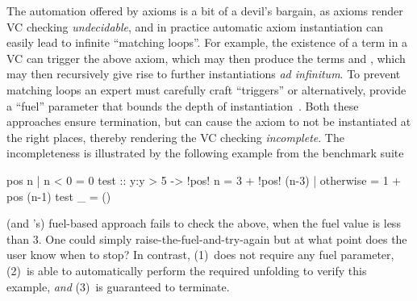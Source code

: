 The automation offered by axioms
is a bit of a devil's bargain,
as axioms render VC checking
\emph{undecidable}, and in
practice automatic axiom
instantiation can easily
lead to infinite ``matching loops''.
%
For example, the existence of
a term  in a VC can
trigger the above axiom,
which may then produce
the terms 
and , which
may then recursively
give rise to further
instantiations
\emph{ad infinitum}.
%
To prevent matching
loops an expert must
carefully craft ``triggers''
or alternatively, provide
a ``fuel'' parameter
that bounds the depth of
instantiation~\citep{Amin2014ComputingWA}.
%
Both these approaches
ensure termination,
but can cause the
axiom to not be
instantiated at
the right places,
thereby rendering
the VC checking
\emph{incomplete}.
%
The incompleteness
is illustrated by
the following example
from the \dafny benchmark
suite~\cite{dafny-github}
%
\begin{mcode}
    pos n | n < 0     = 0                test   :: y:{y > 5} -> {!pos! n = 3 + !pos! (n-3)}
          | otherwise = 1 + pos (n-1)    test _ = ()
\end{mcode}
%
\dafny (and \fstar's) fuel-based approach fails
to check the above, when the fuel value is less
than $3$. One could simply raise-the-fuel-and-try-again
but at what point does the user know when to stop?
%
In contrast, \pbesym (1)~does not require any fuel
parameter, (2)~is able to automatically perform
the required unfolding to verify this example,
\emph{and} (3)~is guaranteed to terminate.


